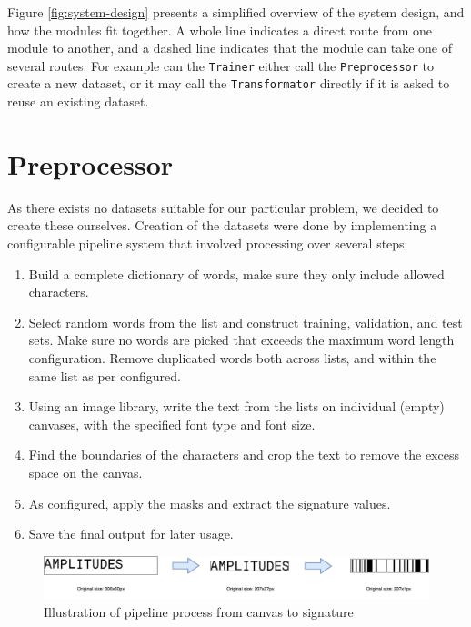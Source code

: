 Figure \ref{fig:system-design} presents a simplified overview of the system design, and how the modules fit together. A whole line indicates a direct route from one module to another, and a dashed line indicates that the module can take one of several routes. For example can the {\tt Trainer} either call the {\tt Preprocessor} to create a new dataset, or it may call the {\tt Transformator} directly if it is asked to reuse an existing dataset.


\section{Preprocessor}
\label{sec:preprocessor}
As there exists no datasets suitable for our particular problem, we decided to create these ourselves. Creation of the datasets were done by implementing a configurable pipeline system that involved processing over several steps:

\begin{enumerate}
    \item Build a complete dictionary of words, make sure they only include allowed characters.
    \item Select random words from the list and construct training, validation, and test sets. Make sure no words are picked that exceeds the maximum word length configuration. Remove duplicated words both across lists, and within the same list as per configured.
    \item Using an image library, write the text from the lists on individual (empty) canvases, with the specified font type and font size.
    \item Find the boundaries of the characters and crop the text to remove the excess space on the canvas.
    \item As configured, apply the masks and extract the signature values.
    \item Save the final output for later usage.
\end{enumerate}

\begin{figure}[H]
    \centering
    \includegraphics[width=1\textwidth]{fig/development_process/pipeline.pdf}
    \caption{Illustration of pipeline process from canvas to signature}
    \label{fig:development-pipeline}
\end{figure}

